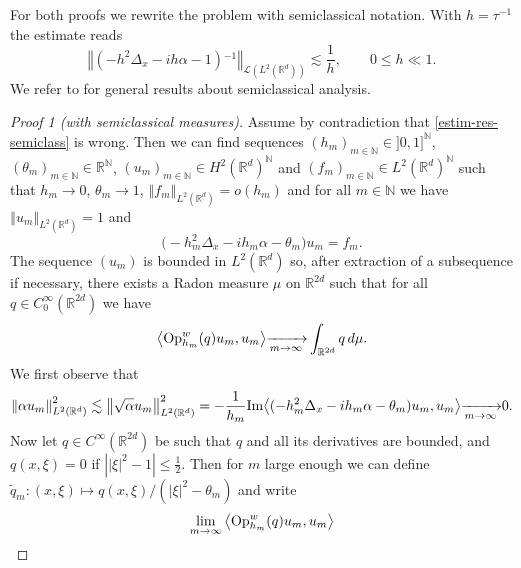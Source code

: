 \documentclass[10pt, a4paper,reqno]{amsart}
\theoremstyle{plain}
\theoremstyle{definition}
\theoremstyle{remark}
\begin{document}
For both proofs we rewrite the problem with semiclassical notation. With $h = {\tau} {^{-1}}$ the estimate reads
\begin{equation} \label{estim-res-semiclass}
{\left\Vert {(-h^2 {{\Delta}_x}  - i h {\alpha} - 1){^{-1}}}\right\Vert}_{{{\mathcal L}}(L^2({\mathbb{R}}^d))} \lesssim \frac 1 h, \qquad 0 {\leqslant} h \ll 1.
\end{equation}
We refer to \cite{zworski} for general results about semiclassical analysis.

\begin{proof}[Proof 1 (with semiclassical measures)]
Assume by contradiction that \eqref{estim-res-semiclass} is wrong. Then we can find sequences ${\left({h}_{m}\right)_{m \in{\mathbb{N}}}} \in ]0,1]^{\mathbb{N}}$, ${\left({{\theta}}_{m}\right)_{m \in{\mathbb{N}}}} \in {\mathbb{R}}^{\mathbb{N}}$, ${\left({u}_{m}\right)_{m \in{\mathbb{N}}}} \in H^2({\mathbb{R}}^d)^{\mathbb{N}}$ and ${\left({f}_{m}\right)_{m \in{\mathbb{N}}}} \in L^2({\mathbb{R}}^d)^{\mathbb{N}}$ such that $h_m \to 0$, ${\theta}_m \to 1$, ${\left\Vert {f_m}\right\Vert}_{L^2({\mathbb{R}}^d)} = o(h_m)$ and for all $m \in {\mathbb{N}}$ we have ${\left\Vert {u_m}\right\Vert}_{L^2({\mathbb{R}}^d)} = 1$ and 
\[
\big(-h_m^2 {{\Delta}_x} - ih_m {\alpha} - {\theta}_m \big) u_m = f_m.
\]
The sequence $(u_m)$ is bounded in $L^2({\mathbb{R}}^d)$ so, after extraction of a subsequence if necessary, there exists a Radon measure ${\mu}$ on ${\mathbb{R}}^{2d}$ such that for all $q \in C_0^\infty({\mathbb{R}}^{2d})$ we have 
\[
{\left< {{{\mathop{\rm{Op}}}_{h_m}^w} (q) u_m} , {u_m} \right>} {\xrightarrow[m \to \infty]{}} \int_{{\mathbb{R}}^{2d}} q \, d{\mu}.
\]
We first observe that
\begin{equation} \label{estim-a-um}
{\left\Vert {{\alpha} u_m}\right\Vert}_{L^2({\mathbb{R}}^d)}^2 \lesssim {\left\Vert {\sqrt {\alpha} u_m}\right\Vert}_{L^2({\mathbb{R}}^d)}^2 = - \frac 1 {h_m} {\mathop{\rm{Im}}\nolimits} {\left< {(-h_m^2 {{\Delta}_x} - i h_m {\alpha} -{\theta}_m)u_m} , {u_m} \right>} {\xrightarrow[m \to \infty]{}} 0.
\end{equation}
Now let $q \in C^\infty({\mathbb{R}}^{2d})$ be such that $q$ and all its derivatives are bounded, and $q(x,{\xi}) = 0$ if ${\left\vert {{\left\vert {\xi}\right\vert}^2 -1}\right\vert} {\leqslant} \frac 12$. Then for $m$ large enough we can define $\tilde q_m : (x,{\xi}) \mapsto q(x,{\xi}) / ({\left\vert {\xi}\right\vert}^2 - {\theta}_m)$ and write 
\begin{align} \label{estim-tilde-q}
\lim_{m \to \infty} {\left< {{{\mathop{\rm{Op}}}_{h_m}^w}(q) u_m} , {u_m} \right>}

\end{align}
\end{proof}
\end{document}
